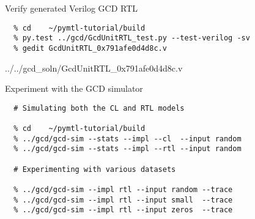 \begin{task}\begin{frame}[fragile]{Verify generated Verilog GCD RTL}
\vspace{-0.25in}
\begin{verbatim}
  % cd    ~/pymtl-tutorial/build
  % py.test ../gcd/GcdUnitRTL_test.py --test-verilog -sv
  % gedit GcdUnitRTL_0x791afe0d4d8c.v
\end{verbatim}

\vspace{-0.3in}
%
{../../gcd_soln/GcdUnitRTL_0x791afe0d4d8c.v}
\end{frame}
\end{task}

\begin{task}\begin{frame}[fragile]{Experiment with the GCD simulator}
\vspace{-0.25in}
\begin{verbatim}
  # Simulating both the CL and RTL models

  % cd    ~/pymtl-tutorial/build
  % ../gcd/gcd-sim --stats --impl --cl  --input random
  % ../gcd/gcd-sim --stats --impl --rtl --input random

  # Experimenting with various datasets

  % ../gcd/gcd-sim --impl rtl --input random --trace
  % ../gcd/gcd-sim --impl rtl --input small  --trace
  % ../gcd/gcd-sim --impl rtl --input zeros  --trace

\end{verbatim}
\end{frame}
\end{task}

